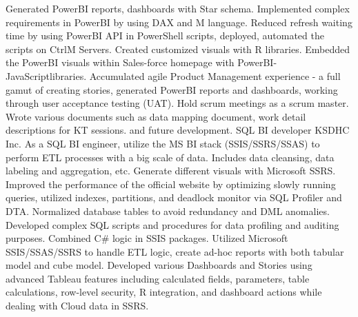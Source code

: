 \documentclass[a4paper]{ReadableCV}
\begin{document}
{Generated PowerBI reports, dashboards with Star schema. Implemented complex requirements in PowerBI by using DAX and M language.}
{Reduced refresh waiting time by using PowerBI API in PowerShell scripts, deployed, automated the scripts on CtrlM Servers.}
{Created customized visuals with R libraries. Embedded the PowerBI visuals within Sales-force homepage with PowerBI-JavaScriptlibraries.}
{Accumulated agile Product Management experience - a full gamut of creating stories, generated PowerBI reports and dashboards, working through user acceptance testing (UAT).}
{Hold scrum meetings as a scrum master. Wrote various documents such as data mapping document, work detail descriptions for KT sessions. and future development.}
{SQL BI developer}
{KSDHC Inc.}
{As a SQL BI engineer, utilize the MS BI stack (SSIS/SSRS/SSAS) to perform ETL processes with a big scale of data. Includes data cleansing, data labeling and aggregation, etc. Generate different visuals with Microsoft SSRS. }
{Improved the performance of the official website by optimizing slowly running queries, utilized indexes, partitions, and deadlock monitor via SQL Profiler and DTA.}
{Normalized database tables to avoid redundancy and DML anomalies.}
{Developed complex SQL scripts and procedures for data profiling and auditing purposes. Combined C\# logic in SSIS packages.}
{Utilized Microsoft SSIS/SSAS/SSRS to handle ETL logic, create ad-hoc reports with both tabular model and cube model.}
{Developed various Dashboards and Stories using advanced Tableau features including calculated fields, parameters, table
calculations, row-level security, R integration, and dashboard actions while dealing with Cloud data in SSRS.}





\end{document}
